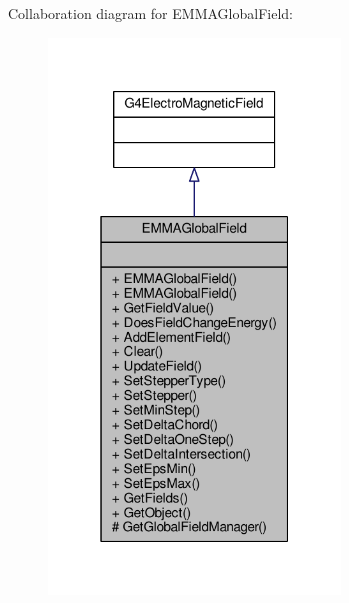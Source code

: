 Collaboration diagram for E\+M\+M\+A\+Global\+Field\+:
\nopagebreak
\begin{figure}[H]
\begin{center}
\leavevmode
\includegraphics[width=220pt]{classEMMAGlobalField__coll__graph}
\end{center}
\end{figure}

